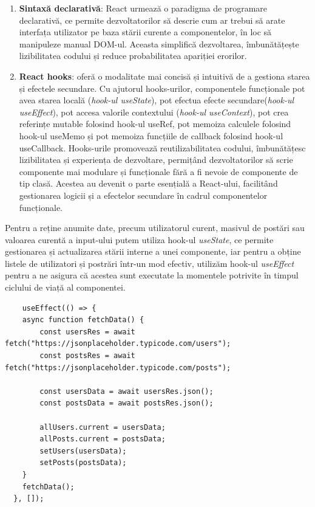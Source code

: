 \documentclass[12pt, a4paper]{report}
\begin{document}
\begin{enumerate}
	\item \textbf{Sintaxă declarativă}: React urmează o paradigma de programare declarativă, ce permite dezvoltatorilor să descrie cum ar trebui să arate interfața utilizator pe baza stării curente a componentelor, în loc să manipuleze manual DOM-ul. Aceasta simplifică dezvoltarea, îmbunătățește lizibilitatea codului și reduce probabilitatea apariției erorilor.
	\item \textbf{React hooks}: oferă o modalitate mai concisă și intuitivă de a gestiona starea și efectele secundare. Cu ajutorul hooks-urilor, componentele funcționale pot avea starea locală (\textit{hook-ul useState}), pot efectua efecte secundare(\textit{hook-ul useEffect}), pot accesa valorile contextului (\textit{hook-ul useContext}), pot crea referințe mutable folosind hook-ul useRef, pot memoiza calculele folosind hook-ul useMemo și pot memoiza funcțiile de callback folosind hook-ul useCallback. Hooks-urile promovează reutilizabilitatea codului, îmbunătățesc lizibilitatea și experiența de dezvoltare, permițând dezvoltatorilor să scrie componente mai modulare și funcționale fără a fi nevoie de componente de tip clasă. Acestea au devenit o parte esențială a React-ului, facilitând gestionarea logicii și a efectelor secundare în cadrul componentelor funcționale. \cite{react-hooks}
\end{enumerate}

Pentru a reține anumite date, precum utilizatorul curent, masivul de postări sau valoarea curentă a input-ului putem utiliza hook-ul \emph{useState}, ce permite gestionarea și actualizarea stării interne a unei componente, iar pentru a obține listele de utilizatori și postrări într-un mod efectiv, utilizăm hook-ul \emph{useEffect} pentru a ne asigura că acestea sunt executate la momentele potrivite în timpul ciclului de viață al componentei.

\begin{lstlisting}
	useEffect(() => {
    async function fetchData() {
    	const usersRes = await fetch("https://jsonplaceholder.typicode.com/users");
    	const postsRes = await fetch("https://jsonplaceholder.typicode.com/posts");
      
		const usersData = await usersRes.json();
    	const postsData = await postsRes.json();

    	allUsers.current = usersData;
    	allPosts.current = postsData;
    	setUsers(usersData);
    	setPosts(postsData);
    }
    fetchData();
  }, []);
\end{lstlisting}
\newpage
\end{document}
